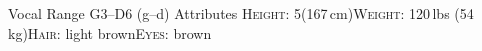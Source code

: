 \begin{cvskills}
  \cvskill
    {Vocal Range}%
    {G3--D6 (g--d\textquotesingle\textquotesingle\textquotesingle)}%
  \cvskill
    {Attributes}%
    {{\scshape Height}: 5\textquotesingle\textquotesingle (167\,cm){\enskip\cdotp\enskip}{\scshape Weight}: 120\,lbs (54\,kg){\enskip\cdotp\enskip}{\scshape Hair}: light brown{\enskip\cdotp\enskip}{\scshape Eyes}: brown}%
\end{cvskills}
